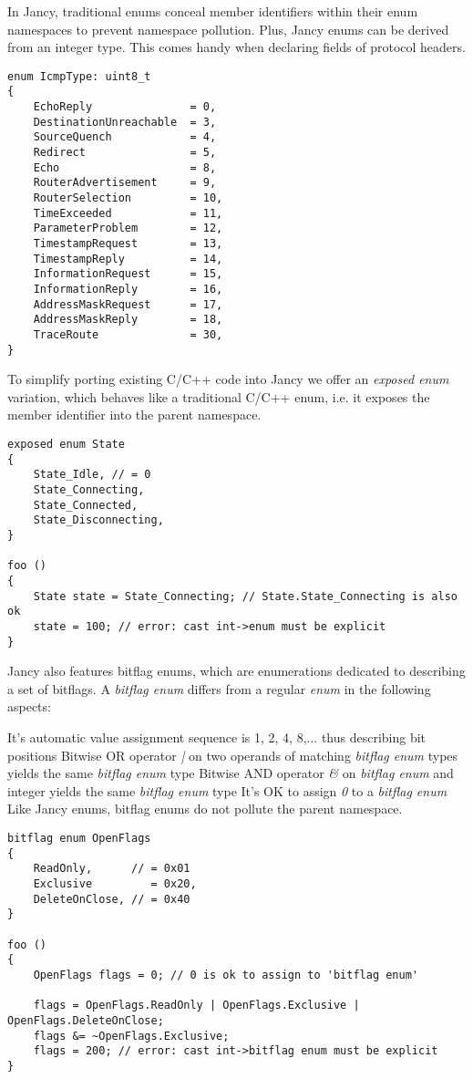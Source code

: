 \documentclass[oneside]{book}
\begin{document}
In Jancy, traditional enums conceal member identifiers within their enum namespaces to prevent namespace pollution. Plus, Jancy enums can be derived from an integer type. This comes handy when declaring fields of protocol headers.

\begin{lstlisting}
enum IcmpType: uint8_t
{
    EchoReply               = 0,
    DestinationUnreachable  = 3,
    SourceQuench            = 4,
    Redirect                = 5,
    Echo                    = 8,
    RouterAdvertisement     = 9,
    RouterSelection         = 10,
    TimeExceeded            = 11,
    ParameterProblem        = 12,
    TimestampRequest        = 13,
    TimestampReply          = 14,
    InformationRequest      = 15,
    InformationReply        = 16,
    AddressMaskRequest      = 17,
    AddressMaskReply        = 18,
    TraceRoute              = 30,
}
\end{lstlisting}

To simplify porting existing C/C++ code into Jancy we offer an \emph{exposed enum} variation, which behaves like a traditional C/C++ enum, i.e. it exposes the member identifier into the parent namespace.

\begin{lstlisting}
exposed enum State
{
    State_Idle, // = 0
    State_Connecting,
    State_Connected,
    State_Disconnecting,
}

foo ()
{
    State state = State_Connecting; // State.State_Connecting is also ok
    state = 100; // error: cast int->enum must be explicit
}
\end{lstlisting}

Jancy also features bitflag enums, which are enumerations dedicated to describing a set of bitflags. A \emph{bitflag enum} differs from a regular \emph{enum} in the following aspects:

It's automatic value assignment sequence is 1, 2, 4, 8,... thus describing bit positions
Bitwise OR operator \emph{|} on two operands of matching \emph{bitflag enum} types yields the same \emph{bitflag enum} type
Bitwise AND operator \emph{\&} on \emph{bitflag enum} and integer yields the same \emph{bitflag enum} type
It's OK to assign \emph{0} to a \emph{bitflag enum}
Like Jancy enums, bitflag enums do not pollute the parent namespace.

\begin{lstlisting}
bitflag enum OpenFlags
{
    ReadOnly,      // = 0x01
    Exclusive         = 0x20,
    DeleteOnClose, // = 0x40
}

foo ()
{
    OpenFlags flags = 0; // 0 is ok to assign to 'bitflag enum'
     
    flags = OpenFlags.ReadOnly | OpenFlags.Exclusive | OpenFlags.DeleteOnClose;
    flags &= ~OpenFlags.Exclusive;
    flags = 200; // error: cast int->bitflag enum must be explicit
}
\end{lstlisting}
\end{document}
